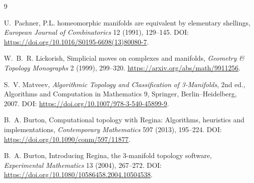 \documentclass[11pt]{article}
\theoremstyle{definition}
\theoremstyle{remark}
\begin{document}
\begin{thebibliography}{9}

U.~Pachner,
\newblock P.L. homeomorphic manifolds are equivalent by elementary shellings,
\newblock \emph{European Journal of Combinatorics} 12 (1991), 129--145.
\newblock DOI: \url{https://doi.org/10.1016/S0195-6698(13)80080-7}.

W.~B.~R. Lickorish,
\newblock Simplicial moves on complexes and manifolds,
\newblock \emph{Geometry \& Topology Monographs} 2 (1999), 299--320.
\newblock \url{https://arxiv.org/abs/math/9911256}.

S.~V. Matveev,
\newblock \emph{Algorithmic Topology and Classification of 3-Manifolds},
\newblock 2nd ed., Algorithms and Computation in Mathematics 9,
Springer, Berlin--Heidelberg, 2007.
\newblock DOI: \url{https://doi.org/10.1007/978-3-540-45899-9}.

B.~A. Burton,
\newblock Computational topology with Regina: Algorithms, heuristics and implementations,
\newblock \emph{Contemporary Mathematics} 597 (2013), 195--224.
\newblock DOI: \url{https://doi.org/10.1090/conm/597/11877}.

B.~A. Burton,
\newblock Introducing Regina, the 3-manifold topology software,
\newblock \emph{Experimental Mathematics} 13 (2004), 267--272.
\newblock DOI: \url{https://doi.org/10.1080/10586458.2004.10504538}.

\end{thebibliography}
\end{document}

